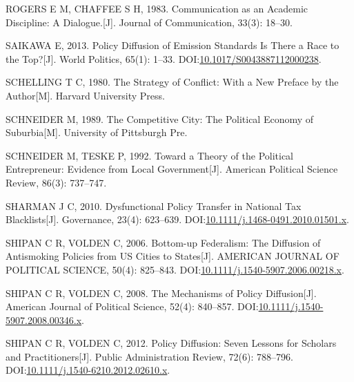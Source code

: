 \documentclass[
  12pt,
]{ctexart}
\newlength{\cslhangindent}
\newlength{\cslentryspacingunit} %
\newenvironment{CSLReferences}[2] %
 {%
  \setlength{\parindent}{0pt}
  \ifodd #1
  \let\oldpar\par
  \def\par{\hangindent=\cslhangindent\oldpar}
  \fi
  \setlength{\parskip}{#2\cslentryspacingunit}
 }%
 {}
\begin{document}
\begin{CSLReferences}{1}{0}
\leavevmode{}%
ROGERS E M, CHAFFEE S H, 1983. Communication as an {Academic Discipline}: {A Dialogue}.{[}J{]}. Journal of Communication, 33(3): 18--30.

\leavevmode{}%
SAIKAWA E, 2013. Policy {Diffusion} of {Emission Standards Is There} a {Race} to the {Top}?{[}J{]}. World Politics, 65(1): 1--33. DOI:\href{https://doi.org/10.1017/S0043887112000238}{10.1017/S0043887112000238}.

\leavevmode{}%
SCHELLING T C, 1980. The {Strategy} of {Conflict}: {With} a {New Preface} by the {Author}{[}M{]}. {Harvard University Press}.

\leavevmode{}%
SCHNEIDER M, 1989. The Competitive City: {The} Political Economy of Suburbia{[}M{]}. {University of Pittsburgh Pre}.

\leavevmode{}%
SCHNEIDER M, TESKE P, 1992. Toward a Theory of the Political Entrepreneur: Evidence from Local Government{[}J{]}. American Political Science Review, 86(3): 737--747.

\leavevmode{}%
SHARMAN J C, 2010. Dysfunctional {Policy Transfer} in {National Tax Blacklists}{[}J{]}. Governance, 23(4): 623--639. DOI:\href{https://doi.org/10.1111/j.1468-0491.2010.01501.x}{10.1111/j.1468-0491.2010.01501.x}.

\leavevmode{}%
SHIPAN C R, VOLDEN C, 2006. Bottom-up Federalism: {The} Diffusion of Antismoking Policies from {US} Cities to States{[}J{]}. AMERICAN JOURNAL OF POLITICAL SCIENCE, 50(4): 825--843. DOI:\href{https://doi.org/10.1111/j.1540-5907.2006.00218.x}{10.1111/j.1540-5907.2006.00218.x}.

\leavevmode{}%
SHIPAN C R, VOLDEN C, 2008. The {Mechanisms} of {Policy Diffusion}{[}J{]}. American Journal of Political Science, 52(4): 840--857. DOI:\href{https://doi.org/10.1111/j.1540-5907.2008.00346.x}{10.1111/j.1540-5907.2008.00346.x}.

\leavevmode{}%
SHIPAN C R, VOLDEN C, 2012. Policy {Diffusion}: {Seven Lessons} for {Scholars} and {Practitioners}{[}J{]}. Public Administration Review, 72(6): 788--796. DOI:\href{https://doi.org/10.1111/j.1540-6210.2012.02610.x}{10.1111/j.1540-6210.2012.02610.x}.


\end{CSLReferences}
\end{document}
